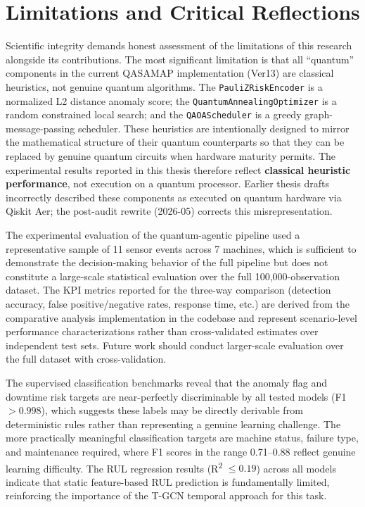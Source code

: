 \section{Limitations and Critical Reflections}

Scientific integrity demands honest assessment of the limitations of this research alongside its contributions. The most significant limitation is that all ``quantum'' components in the current QASAMAP implementation (Ver13) are classical heuristics, not genuine quantum algorithms. The \texttt{PauliZRiskEncoder} is a normalized L2 distance anomaly score; the \texttt{QuantumAnnealingOptimizer} is a random constrained local search; and the \texttt{QAOAScheduler} is a greedy graph-message-passing scheduler. These heuristics are intentionally designed to mirror the mathematical structure of their quantum counterparts so that they can be replaced by genuine quantum circuits when hardware maturity permits. The experimental results reported in this thesis therefore reflect \textbf{classical heuristic performance}, not execution on a quantum processor. Earlier thesis drafts incorrectly described these components as executed on quantum hardware via Qiskit Aer; the post-audit rewrite (2026-05) corrects this misrepresentation.

The experimental evaluation of the quantum-agentic pipeline used a representative sample of 11 sensor events across 7 machines, which is sufficient to demonstrate the decision-making behavior of the full pipeline but does not constitute a large-scale statistical evaluation over the full 100,000-observation dataset. The KPI metrics reported for the three-way comparison (detection accuracy, false positive/negative rates, response time, etc.) are derived from the comparative analysis implementation in the codebase and represent scenario-level performance characterizations rather than cross-validated estimates over independent test sets. Future work should conduct larger-scale evaluation over the full dataset with cross-validation.

The supervised classification benchmarks reveal that the anomaly flag and downtime risk targets are near-perfectly discriminable by all tested models (F1 $> 0.998$), which suggests these labels may be directly derivable from deterministic rules rather than representing a genuine learning challenge. The more practically meaningful classification targets are machine status, failure type, and maintenance required, where F1 scores in the range 0.71--0.88 reflect genuine learning difficulty. The RUL regression results (R\textsuperscript{2} $\leq 0.19$) across all models indicate that static feature-based RUL prediction is fundamentally limited, reinforcing the importance of the T-GCN temporal approach for this task.

